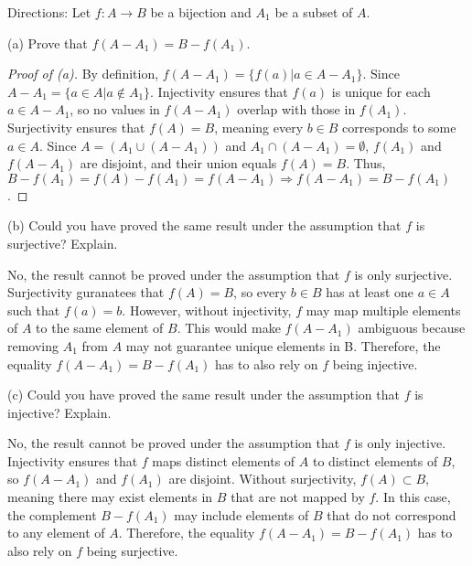 \documentclass{article}
\begin{document}
Directions: Let $f:A\to B$ be a bijection and $A_1$ be a subset of $A$.

(a) Prove that $f(A - A_1) = B - f(A_1)$.
\begin{proof}[Proof of (a)]
    By definition, $f(A - A_1) = \{f(a)  |a\in A - A_1\}$. Since $A-A_1 =\{a\in A | a\notin A_1\}$.
    Injectivity ensures that $f(a)$ is unique for each $a\in A-A_1$, so no values in $f(A - A_1)$ overlap with those in $f(A_1)$.
    Surjectivity ensures that $f(A)=B$, meaning every $b\in B$ corresponds to some $a\in A$.
    Since $A = (A_1\cup(A-A_1))$ and $A_1\cap(A-A_1) = \emptyset$, $f(A_1)$ and $f(A-A_1)$ are disjoint, and their union equals $f(A) = B$.
    Thus, $B-f(A_1) = f(A) - f(A_1) = f(A-A_1)\Rightarrow f(A-A_1)=B-f(A_1)$.
\end{proof}
(b) Could you have proved the same result under the assumption that $f$ is surjective? Explain.

No, the result cannot be proved under the assumption that $f$ is only surjective. 
Surjectivity guranatees that $f(A) = B$, so every $b\in B$ has at least one $a\in A$ such that $f(a) = b$.
However, without injectivity, $f$ may map multiple elements of $A$ to the same element of $B$.
This would make $f(A-A_1)$ ambiguous because removing $A_1$ from $A$ may not guarantee unique elements in B.
Therefore, the equality $f(A-A_1) = B - f(A_1)$ has to also rely on $f$ being injective.

(c) Could you have proved the same result under the assumption that $f$ is injective? Explain.

No, the result cannot be proved under the assumption that $f$ is only injective. 
Injectivity ensures that $f$ maps distinct elements of $A$ to distinct elements of $B$, so $f(A-A_1)$ and $f(A_1)$ are disjoint.
Without surjectivity, $f(A)\subset B$, meaning there may exist elements in $B$ that are not mapped by $f$.
In this case, the complement $B-f(A_1)$ may include elements of $B$ that do not correspond to any element of $A$.
Therefore, the equality $f(A-A_1) = B - f(A_1)$ has to also rely on $f$ being surjective.
\end{document}
